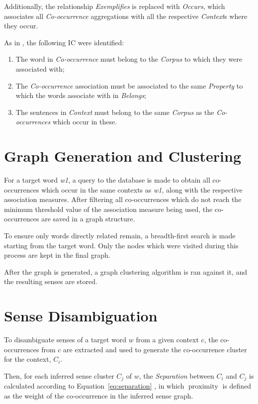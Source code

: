 Additionally, the relationship \emph{Exemplifies} is replaced with
\emph{Occurs}, which associates all \emph{Co-occurrence} aggregations with all
the respective \emph{Context}s where they occur.

As in \cite{correia2015syntax}, the following \ac{IC} were identified:

\begin{enumerate}
  \item The word in \emph{Co-occurrence} must belong to the \emph{Corpus} to
    which they were associated with;
  \item The \emph{Co-occurrence} association must be associated to the same
    \emph{Property} to which the words associate with in \emph{Belongs};
  \item The sentences in \emph{Context} must belong to the same \emph{Corpus}
    as the \emph{Co-occurrences} which occur in these.
\end{enumerate}

\section{Graph Generation and Clustering}

For a target word \emph{w1}, a query to the database is made to obtain all
co-occurrences which occur in the same contexts as \emph{w1}, along with the
respective association measures. After filtering all co-occurrences which do not
reach the minimum threshold value of the association measure being used, the
co-occurrences are saved in a graph structure.

To ensure only words directly related remain, a breadth-first search is made
starting from the target word. Only the nodes which were visited during this
process are kept in the final graph.

After the graph is generated, a graph clustering algorithm is ran against it,
and the resulting senses are stored.

\section{Sense Disambiguation}

To disambiguate senses of a target word $w$ from a given context
$c$, the co-occurrences from $c$ are extracted and used to generate
the co-occurrence cluster for the context, $C_i$.

Then, for each inferred sense cluster $C_j$ of $w$, the
\emph{Separation} between $C_i$ and $C_j$ is calculated according to
Equation~\ref{eq:separation} \cite{hope2013uos}, in which
$\operatorname{proximity}$ is defined as the weight of the co-occurrence in the
inferred sense graph.

